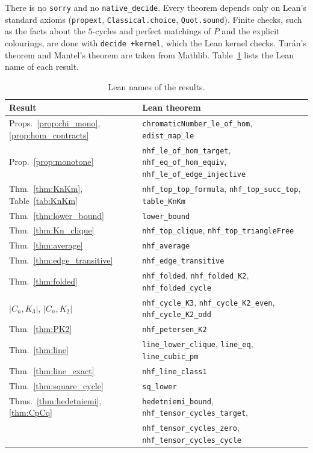 \documentclass{article}
\theoremstyle{definition}
\newcommand{\lean}[1]{\texttt{#1}}
\begin{document}
There is no \lean{sorry} and no \lean{native\_decide}.  Every theorem depends only
on Lean's standard axioms (\lean{propext}, \lean{Classical.choice},
\lean{Quot.sound}).  Finite checks, such as the facts about the $5$-cycles and
perfect matchings of $P$ and the explicit colourings, are done with
\lean{decide~+kernel}, which the Lean kernel checks.  Tur\'an's theorem and
Mantel's theorem are taken from Mathlib.  Table~\ref{tab:lean} lists the Lean
name of each result.

\begin{table}[ht]
\centering
\caption{Lean names of the results.}
\label{tab:lean}
\small
\begin{tabular}{ll}
\toprule
Result & Lean theorem \\
\midrule
Props.~\ref{prop:chi_mono}, \ref{prop:hom_contracts} & \lean{chromaticNumber\_le\_of\_hom}, \lean{edist\_map\_le} \\
Prop.~\ref{prop:monotone} & \lean{nhf\_le\_of\_hom\_target}, \lean{nhf\_eq\_of\_hom\_equiv}, \lean{nhf\_le\_of\_edge\_injective} \\
Thm.~\ref{thm:KnKm}, Table~\ref{tab:KnKm} & \lean{nhf\_top\_top\_formula}, \lean{nhf\_top\_succ\_top}, \lean{table\_KnKm} \\
Thm.~\ref{thm:lower_bound} & \lean{lower\_bound} \\
Thm.~\ref{thm:Kn_clique} & \lean{nhf\_top\_clique}, \lean{nhf\_top\_triangleFree} \\
Thm.~\ref{thm:average} & \lean{nhf\_average} \\
Thm.~\ref{thm:edge_transitive} & \lean{nhf\_edge\_transitive} \\
Thm.~\ref{thm:folded} & \lean{nhf\_folded}, \lean{nhf\_folded\_K2}, \lean{nhf\_folded\_cycle} \\
$|C_n,K_3|$, $|C_n,K_2|$ & \lean{nhf\_cycle\_K3}, \lean{nhf\_cycle\_K2\_even}, \lean{nhf\_cycle\_K2\_odd} \\
Thm.~\ref{thm:PK2} & \lean{nhf\_petersen\_K2} \\
Thm.~\ref{thm:line} & \lean{line\_lower\_clique}, \lean{line\_eq}, \lean{line\_cubic\_pm} \\
Thm.~\ref{thm:line_exact} & \lean{nhf\_line\_class1} \\
Thm.~\ref{thm:square_cycle} & \lean{sq\_lower} \\
Thms.~\ref{thm:hedetniemi}, \ref{thm:CpCq} & \lean{hedetniemi\_bound}, \lean{nhf\_tensor\_cycles\_target}, \\
 & \lean{nhf\_tensor\_cycles\_zero}, \lean{nhf\_tensor\_cycles\_cycle} \\

\end{tabular}
\end{table}
\end{document}
